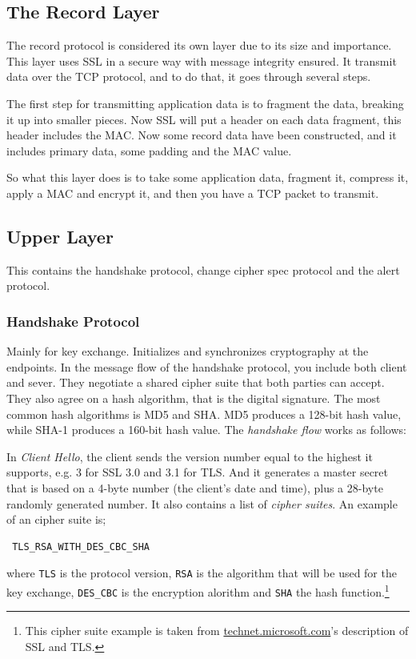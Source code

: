 \documentclass[11pt,a4paper, twocolumn]{article}
\begin{document}
\subsection{The Record Layer}
The record protocol is considered its own layer due to its size and importance. This layer uses SSL in a secure way with message integrity ensured. 
It transmit data over the TCP protocol, and to do that, it goes through several steps. 

The first step for transmitting application data is to fragment the data, breaking it up into smaller pieces. Now SSL will put a header on each data fragment, this header includes the MAC. Now some record data have been constructed, and it includes primary data, some padding and the MAC value.

So what this layer does is to take some application data, fragment it, compress it, apply a MAC and encrypt it, and then you have a TCP packet to transmit.


\subsection{Upper Layer}
This contains the handshake protocol, change cipher spec protocol and the alert protocol.

\subsubsection{Handshake Protocol}
Mainly for key exchange. Initializes and synchronizes cryptography at the endpoints.
In the message flow of the handshake protocol, you include both client and sever. They negotiate a shared cipher suite that both parties can accept. They also agree on a hash algorithm, that is the digital signature. The most common hash algorithms is MD5 and SHA. MD5 produces a 128-bit hash value, while SHA-1 produces a 160-bit hash value.
The \textit{handshake flow} works as follows: 

In \textit{Client Hello}, the client sends the version number equal to the highest it supports, e.g. 3 for SSL 3.0 and 3.1 for TLS. And it generates a master secret that is based on a 4-byte number (the client's date and time), plus a 28-byte randomly generated number. It also contains a list of \textit{cipher suites}. An example of an cipher suite is;
\begin{verbatim}
 TLS_RSA_WITH_DES_CBC_SHA
\end{verbatim}
where \texttt{TLS} is the protocol version, \texttt{RSA} is the algorithm that will be used for the key exchange, \texttt{DES\_CBC} is the encryption alorithm and \texttt{SHA} the hash function.\footnote{This cipher suite example is taken from \url{technet.microsoft.com}'s description of SSL and TLS.}
\end{document}
